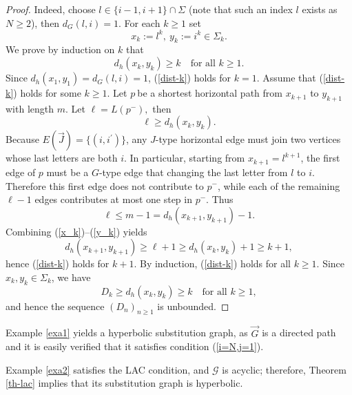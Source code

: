 \documentclass[reqno]{amsart}
\theoremstyle{plain}
\numberwithin{equation}{section}
\begin{document}
\begin{proof}
Indeed, choose $l\in \{i-1,i+1\}\cap \Sigma $ (note that such an index $l$
exists as $N\geq 2$), then $d_{G}(l,i)=1$. For each $k\geq 1$ set 
\begin{equation*}
x_{k}:=l^{k},\ y_{k}:=i^{k}\in \Sigma _{k}.
\end{equation*}%
We prove by induction on $k$ that%
\begin{equation}
d_{h}(x_{k},y_{k})\geq k\quad \text{for all }k\geq 1.  \label{dist-k}
\end{equation}%
Since $d_{h}(x_{1},y_{1})=d_{G}(l,i)=1$, (\ref{dist-k}) holds for $k=1$.
Assume that (\ref{dist-k}) holds for some $k\geq 1$. Let $p\ $be a shortest
horizontal path from $x_{k+1}$ to $y_{k+1}$ with length $m$. Let $\ell
=L(p^{-}),$ then 
\begin{equation}
\ell \geq d_{h}(x_{k},y_{k}).  \label{x_k}
\end{equation}%
Because $E(\vec{J})=\{(i,i^{\prime })\}$, any $J$-type horizontal edge must
join two vertices whose last letters are both $i$. In particular, starting
from $x_{k+1}=l^{k+1}$, the first edge of $p$ must be a $G$-type edge that
changing the last letter from $l$ to $i$. Therefore this first edge does not
contribute to $p^{-}$, while each of the remaining $\ell -1$ edges
contributes at most one step in $p^{-}$. Thus 
\begin{equation}
\ell \leq m-1=d_{h}(x_{k+1},y_{k+1})-1.  \label{y_k}
\end{equation}%
Combining (\ref{x_k})--(\ref{y_k}) yields 
\begin{equation*}
d_{h}(x_{k+1},y_{k+1})\geq \ell +1\geq d_{h}(x_{k},y_{k})+1\geq k+1,
\end{equation*}%
hence (\ref{dist-k}) holds for $k+1$. By induction, (\ref{dist-k}) holds for
all $k\geq 1$. Since $x_{k},y_{k}\in \Sigma _{k}$, we have 
\begin{equation*}
D_{k}\geq d_{h}(x_{k},y_{k})\geq k\quad \text{for all }k\geq 1,
\end{equation*}%
and hence the sequence $(D_{n})_{n\geq 1}$ is unbounded.
\end{proof}

Example \ref{exa1} yields a hyperbolic substitution graph, as $%
\overrightarrow{G}$ is a directed path and it is easily verified that it
satisfies condition (\ref{i=N,j=1}).

Example \ref{exa2} satisfies the LAC condition, and $\mathcal{G}$ is
acyclic; therefore, Theorem \ref{th-lac} implies that its substitution graph
is hyperbolic.
\end{document}
